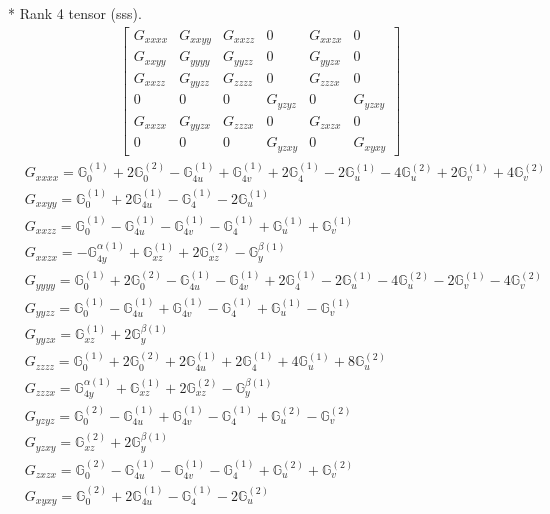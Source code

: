 \documentclass[fleqn,8pt,landscape]{jsarticle}
\begin{document}
* Rank 4 tensor (sss).
\begin{align*}
\begin{bmatrix} G_{xxxx} & G_{xxyy} & G_{xxzz} & 0 & G_{xxzx} & 0 \\ G_{xxyy} & G_{yyyy} & G_{yyzz} & 0 & G_{yyzx} & 0 \\ G_{xxzz} & G_{yyzz} & G_{zzzz} & 0 & G_{zzzx} & 0 \\ 0 & 0 & 0 & G_{yzyz} & 0 & G_{yzxy} \\ G_{xxzx} & G_{yyzx} & G_{zzzx} & 0 & G_{zxzx} & 0 \\ 0 & 0 & 0 & G_{yzxy} & 0 & G_{xyxy} \end{bmatrix}
\end{align*}
\begin{align*}
& G_{xxxx} = \mathbb{G}_{0}^{(1)} + 2 \mathbb{G}_{0}^{(2)} - \mathbb{G}_{4u}^{(1)} + \mathbb{G}_{4v}^{(1)} + 2 \mathbb{G}_{4}^{(1)} - 2 \mathbb{G}_{u}^{(1)} - 4 \mathbb{G}_{u}^{(2)} + 2 \mathbb{G}_{v}^{(1)} + 4 \mathbb{G}_{v}^{(2)} \\
& G_{xxyy} = \mathbb{G}_{0}^{(1)} + 2 \mathbb{G}_{4u}^{(1)} - \mathbb{G}_{4}^{(1)} - 2 \mathbb{G}_{u}^{(1)} \\
& G_{xxzz} = \mathbb{G}_{0}^{(1)} - \mathbb{G}_{4u}^{(1)} - \mathbb{G}_{4v}^{(1)} - \mathbb{G}_{4}^{(1)} + \mathbb{G}_{u}^{(1)} + \mathbb{G}_{v}^{(1)} \\
& G_{xxzx} = - \mathbb{G}_{4y}^{\alpha(1)} + \mathbb{G}_{xz}^{(1)} + 2 \mathbb{G}_{xz}^{(2)} - \mathbb{G}_{y}^{\beta(1)} \\
& G_{yyyy} = \mathbb{G}_{0}^{(1)} + 2 \mathbb{G}_{0}^{(2)} - \mathbb{G}_{4u}^{(1)} - \mathbb{G}_{4v}^{(1)} + 2 \mathbb{G}_{4}^{(1)} - 2 \mathbb{G}_{u}^{(1)} - 4 \mathbb{G}_{u}^{(2)} - 2 \mathbb{G}_{v}^{(1)} - 4 \mathbb{G}_{v}^{(2)} \\
& G_{yyzz} = \mathbb{G}_{0}^{(1)} - \mathbb{G}_{4u}^{(1)} + \mathbb{G}_{4v}^{(1)} - \mathbb{G}_{4}^{(1)} + \mathbb{G}_{u}^{(1)} - \mathbb{G}_{v}^{(1)} \\
& G_{yyzx} = \mathbb{G}_{xz}^{(1)} + 2 \mathbb{G}_{y}^{\beta(1)} \\
& G_{zzzz} = \mathbb{G}_{0}^{(1)} + 2 \mathbb{G}_{0}^{(2)} + 2 \mathbb{G}_{4u}^{(1)} + 2 \mathbb{G}_{4}^{(1)} + 4 \mathbb{G}_{u}^{(1)} + 8 \mathbb{G}_{u}^{(2)} \\
& G_{zzzx} = \mathbb{G}_{4y}^{\alpha(1)} + \mathbb{G}_{xz}^{(1)} + 2 \mathbb{G}_{xz}^{(2)} - \mathbb{G}_{y}^{\beta(1)} \\
& G_{yzyz} = \mathbb{G}_{0}^{(2)} - \mathbb{G}_{4u}^{(1)} + \mathbb{G}_{4v}^{(1)} - \mathbb{G}_{4}^{(1)} + \mathbb{G}_{u}^{(2)} - \mathbb{G}_{v}^{(2)} \\
& G_{yzxy} = \mathbb{G}_{xz}^{(2)} + 2 \mathbb{G}_{y}^{\beta(1)} \\
& G_{zxzx} = \mathbb{G}_{0}^{(2)} - \mathbb{G}_{4u}^{(1)} - \mathbb{G}_{4v}^{(1)} - \mathbb{G}_{4}^{(1)} + \mathbb{G}_{u}^{(2)} + \mathbb{G}_{v}^{(2)} \\
& G_{xyxy} = \mathbb{G}_{0}^{(2)} + 2 \mathbb{G}_{4u}^{(1)} - \mathbb{G}_{4}^{(1)} - 2 \mathbb{G}_{u}^{(2)}
\end{align*}
\end{document}

